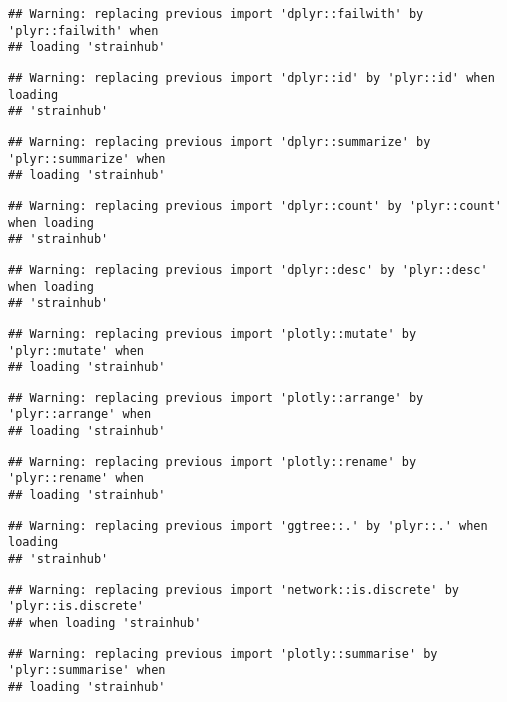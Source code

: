 \documentclass[
]{article}
\begin{document}
\begin{verbatim}
## Warning: replacing previous import 'dplyr::failwith' by 'plyr::failwith' when
## loading 'strainhub'
\end{verbatim}

\begin{verbatim}
## Warning: replacing previous import 'dplyr::id' by 'plyr::id' when loading
## 'strainhub'
\end{verbatim}

\begin{verbatim}
## Warning: replacing previous import 'dplyr::summarize' by 'plyr::summarize' when
## loading 'strainhub'
\end{verbatim}

\begin{verbatim}
## Warning: replacing previous import 'dplyr::count' by 'plyr::count' when loading
## 'strainhub'
\end{verbatim}

\begin{verbatim}
## Warning: replacing previous import 'dplyr::desc' by 'plyr::desc' when loading
## 'strainhub'
\end{verbatim}

\begin{verbatim}
## Warning: replacing previous import 'plotly::mutate' by 'plyr::mutate' when
## loading 'strainhub'
\end{verbatim}

\begin{verbatim}
## Warning: replacing previous import 'plotly::arrange' by 'plyr::arrange' when
## loading 'strainhub'
\end{verbatim}

\begin{verbatim}
## Warning: replacing previous import 'plotly::rename' by 'plyr::rename' when
## loading 'strainhub'
\end{verbatim}

\begin{verbatim}
## Warning: replacing previous import 'ggtree::.' by 'plyr::.' when loading
## 'strainhub'
\end{verbatim}

\begin{verbatim}
## Warning: replacing previous import 'network::is.discrete' by 'plyr::is.discrete'
## when loading 'strainhub'
\end{verbatim}

\begin{verbatim}
## Warning: replacing previous import 'plotly::summarise' by 'plyr::summarise' when
## loading 'strainhub'
\end{verbatim}
\end{document}
